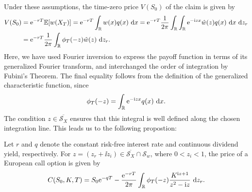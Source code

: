 Under these assumptions, the time-zero price $V(S_0)$ of the claim is given by
\begin{align*}
  V(S_0)&= \text{e}^{-rT}\mathbb{E}[w(X_T)] = \text{e}^{-rT}\int_{\mathbb{R}} w(x)q(x) \text{ d} x 
  = \text{e}^{-rT}\frac{1}{2\pi} \int_{\mathbb{R}} \int_{\mathbb{R}} \text{e}^{-\text{i} z x}\hat{w}(z)q(x) \text{ d} x \text{ d} z_r \\
        &=\text{e}^{-rT} \frac{1}{2\pi} \int_{\mathbb{R}} \phi_T(-z)\hat{w}(z) \text{ d} z_r.
\end{align*}
Here, we have used Fourier inversion to express the payoff function in terms of its generalized
Fourier transform, and interchanged the order of integration by Fubini's Theorem. The final equality
follows from the definition of the generalized characteristic function, since
\[
  \phi_T(-z) = \int_{\mathbb{R}} \text{e}^{-\text{i} z x}q(x)\text{ d} x.
\]
The condition $z \in \overline{\mathcal{S}_X}$ ensures that this integral is well defined along the
chosen integration line. This leads us to the following propostion:
\begin{proposition}
  \label{prop:gen-ft-call}
  Let $r$ and $q$ denote the constant risk-free interest rate and
  continuous dividend yield, respectively. For
  $z=(z_r+\ii z_i)\in\overline{\mathcal{S}_X}\cap\mathcal{S}_w$,
  where $0<z_i<1$, the price of a European call option is given by
  \begin{equation}
    C(S_0,K,T)
    = S_0\text{e}^{-qT}
    - \frac{\text{e}^{-rT}}{2\pi}
    \int_{\mathbb{R}}\phi_T(-z)
    \frac{K^{\text{i} z+1}}{z^2-\text{i} z}\text{ d} z_r.
    \label{eq:gen-ft-call}
  \end{equation}
\end{proposition}
